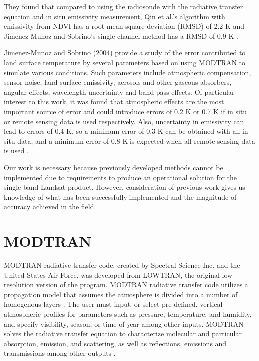 \documentclass{book}
\begin{document}
They found that compared to using the radiosonde with the radiative transfer equation and in situ emissivity measurement, Qin et al.'s algorithm with emissivity from NDVI has a root mean square deviation (RMSD) of 2.2 K and Jimenez-Munoz and Sobrino's single channel method has a RMSD of 0.9 K \cite{sobrino_2004}.

Jimenez-Munoz and Sobrino (2004) provide a study of the error contributed to land surface temperature by several parameters based on using MODTRAN to simulate various conditions.  Such parameters include atmospheric compensation, sensor noise, land surface emissivity, aerosols and other gaseous absorbers, angular effects, wavelength uncertainty and band-pass effects.  Of particular interest to this work, it was found that atmospheric effects are the most important source of error and could introduce errors of 0.2 K or 0.7 K if in situ or remote sensing data is used respectively.  Also, uncertainty in emissivity can lead to errors of 0.4 K, so a minimum error of 0.3 K can be obtained with all in situ data, and a minimum error of 0.8 K is expected when all remote sensing data is used \cite{jimenez-munoz_2004}.

Our work is necessary because previously developed methods cannot be implemented due to requirements to produce an operational solution for the single band Landsat product.  However, consideration of previous work gives us knowledge of what has been successfully implemented and the magnitude of accuracy achieved in the field.

\section{MODTRAN}
\label{sec:modtran}

MODTRAN radiative transfer code, created by Spectral Science Inc. and the United States Air Force, was developed from LOWTRAN, the original low resolution version of the program.  MODTRAN radiative transfer code utilizes a propagation model that assumes the atmosphere is divided into a number of homogenous layers \cite{schott}.  The user must input, or select pre-defined, vertical atmospheric profiles for parameters such as pressure, temperature, and humidity, and specify visibility, season, or time of year among other inputs.  MODTRAN solves the radiative transfer equation to characterize molecular and particular absorption, emission, and scattering, as well as reflections, emissions and transmissions among other outputs \cite{modtranweb}. 
\end{document}
